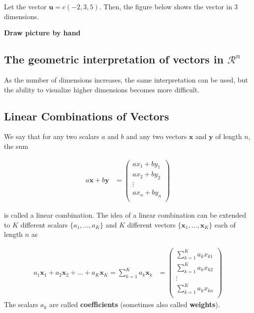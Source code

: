 \documentclass[
]{book}
\theoremstyle{definition}
\theoremstyle{definition}
\theoremstyle{definition}
\theoremstyle{definition}
\theoremstyle{remark}
\begin{document}
Let the vector \(\mathbf{u} = c(-2, 3, 5)\). Then, the figure below shows the vector in 3 dimensions.

\textbf{Draw picture by hand}

\hypertarget{the-geometric-interpretation-of-vectors-in-mathcalrn}{%
\subsection{\texorpdfstring{The geometric interpretation of vectors in \(\mathcal{R}^n\)}{The geometric interpretation of vectors in \textbackslash mathcal\{R\}\^{}n}}\label{the-geometric-interpretation-of-vectors-in-mathcalrn}}

As the number of dimensions increases, the same interpretation can be used, but the ability to visualize higher dimensions becomes more difficult.

\hypertarget{linear-combinations-of-vectors}{%
\subsection{Linear Combinations of Vectors}\label{linear-combinations-of-vectors}}

We say that for any two scalars \(a\) and \(b\) and any two vectors \(\mathbf{x}\) and \(\mathbf{y}\) of length \(n\), the sum

\[
\begin{aligned}
a \mathbf{x} + b \mathbf{y} & = \begin{pmatrix}
a x_1 + b y_1 \\
a x_2 + b y_2 \\
\vdots \\
a x_n + b y_n \\
\end{pmatrix}
\end{aligned}
\]

is called a linear combination. The idea of a linear combination can be extended to \(K\) different scalars \(\{ a_1, \ldots, a_K \}\) and \(K\) different vectors \(\{ \mathbf{x}_1, \ldots, \mathbf{x}_K\}\) each of length \(n\) as

\[
 \begin{aligned}
a_1 \mathbf{x}_1 + a_2 \mathbf{x}_2 +  \ldots + a_K \mathbf{x}_K = 
\sum_{k=1}^K a_k \mathbf{x}_k & = \begin{pmatrix}
\sum_{k=1}^K a_k x_{k1} \\
\sum_{k=1}^K a_k x_{k2} \\
\vdots \\
\sum_{k=1}^K a_k x_{kn} \\
\end{pmatrix}
\end{aligned}
\]
The scalars \(a_k\) are called \textbf{coefficients} (sometimes also called \textbf{weights}).
\end{document}
